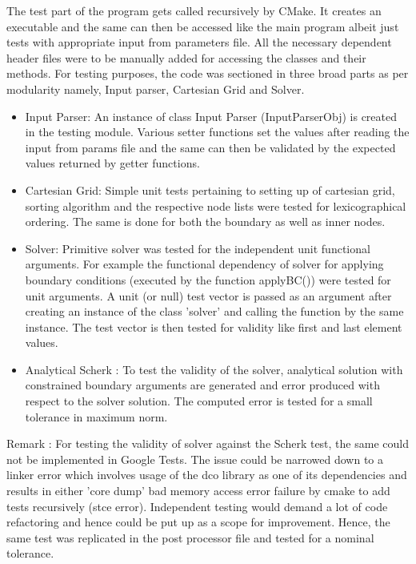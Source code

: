 \documentclass[11pt]{scrartcl}
\begin{document}
The test part of the program gets called recursively by CMake. It creates an executable and the same can then be accessed like the main program albeit just tests with appropriate input from parameters file. All the necessary dependent header files were to be manually added for accessing the classes and their methods.
For testing purposes, the code was sectioned in three broad parts as per modularity namely, Input parser, Cartesian Grid and Solver.  
\begin{itemize}
  \item Input Parser: An instance of class Input Parser (InputParserObj) is created in the testing module. Various setter functions set the values after reading the input from params file and the same can then be validated by the expected values returned by getter functions.
  \item Cartesian Grid: Simple unit tests pertaining to setting up of cartesian grid, sorting algorithm and the respective node lists were tested for lexicographical ordering. The same is done for both the boundary as well as inner nodes.
 \item Solver: Primitive solver was tested for the independent unit functional arguments. For example the functional dependency of solver for applying boundary conditions (executed by the function applyBC()) were tested for unit arguments. A unit (or null) test vector is passed as an argument after creating an instance of the class 'solver' and calling the function by the same instance. The test vector is then tested for validity like first and last element  values.  
 \item Analytical Scherk : To test the validity of the solver, analytical solution with constrained boundary arguments are generated and error produced with respect to the solver solution. The computed error is tested for a small tolerance in maximum norm.
\end{itemize}

Remark : For testing the validity of solver against the Scherk test, the same could not be implemented in Google Tests. The issue could be narrowed down to a linker error which involves usage of the dco library as one of its dependencies and results in either 'core dump' bad memory access error failure by cmake to add tests recursively (stce error). Independent testing would demand a lot of code refactoring and hence could be put up as a scope for improvement. Hence, the same test was replicated in the post processor file and tested for a nominal tolerance. 
\end{document}
